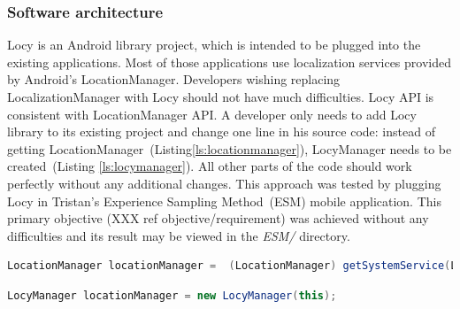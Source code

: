 \subsubsection{Software architecture}
\label{s:design:locy:architecture}
\hspace{10pt}Locy is an Android library project, which is intended to be plugged into the existing applications. Most of those applications use localization services provided by Android's LocationManager. Developers wishing replacing LocalizationManager with Locy should not have much difficulties. Locy API is consistent with LocationManager API. A developer only needs to add Locy library to its existing project and change one line in his source code: instead of getting LocationManager\ (Listing\ref{ls:locationmanager}), LocyManager needs to be created\ (Listing \ref{ls:locymanager}). All other parts of the code should work perfectly without any additional changes. This approach was tested by plugging Locy in Tristan's Experience Sampling Method\ (ESM) mobile application. This primary objective (XXX ref objective/requirement) was achieved without any difficulties and its result may be viewed in the \textit{ESM/} directory.

                 
\begin{lstlisting}[language=Java,
       basicstyle=\ttfamily,
       keywordstyle=\color{blue}\ttfamily,
       stringstyle=\color{red}\ttfamily,
       commentstyle=\color{green}\ttfamily,
      breaklines=true,
      frame=single,    
      label=ls:locationmanager,caption=Localization services with LocationManager.]
LocationManager locationManager =  (LocationManager) getSystemService(LOCATION_SERVICE);
\end{lstlisting}

\begin{lstlisting}[language=Java,
       basicstyle=\ttfamily,
       keywordstyle=\color{blue}\ttfamily,
       stringstyle=\color{red}\ttfamily,
       commentstyle=\color{green}\ttfamily,
      breaklines=true,
      frame=single,    
      label=ls:locymanager,caption=Localization services with LocyManager.]
LocyManager locationManager = new LocyManager(this);
\end{lstlisting}

